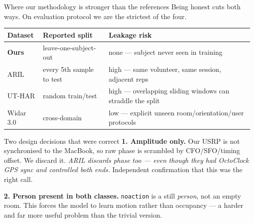 \documentclass[aspectratio=169,10pt]{beamer}
\newcommand{\gd}[1]{\textcolor{good}{#1}}
\newcommand{\bd}[1]{\textcolor{bad}{#1}}
\begin{document}
\begin{frame}{Where our methodology is stronger than the references}
\footnotesize
Being honest cuts both ways. On evaluation protocol we are the strictest of the four.

\vspace{0.3em}
\begin{table}\scriptsize
\begin{tabular}{@{}lll@{}}
\toprule
\textbf{Dataset} & \textbf{Reported split} & \textbf{Leakage risk}\\
\midrule
\rowcolor{green!8}\textbf{Ours} & leave-one-subject-out & \gd{none --- subject never seen in training}\\
ARIL & every 5th sample to test & \bd{high} --- same volunteer, same session, adjacent reps\\
UT-HAR & random train/test & \bd{high} --- overlapping sliding windows can straddle the split\\
Widar 3.0 & cross-domain & \gd{low} --- explicit unseen room/orientation/user protocols\\
\bottomrule
\end{tabular}
\end{table}

\vspace{0.3em}
\begin{block}{\small Two design decisions that were correct}
\scriptsize
\textbf{1. Amplitude only.} Our USRP is not synchronised to the MacBook, so raw phase is
scrambled by CFO/SFO/timing offset. We discard it. \emph{ARIL discards phase too --- even
though they had OctoClock GPS sync and controlled both ends.} Independent confirmation
that this was the right call.

\vspace{0.2em}
\textbf{2. Person present in both classes.} \texttt{noaction} is a still \emph{person},
not an empty room. This forces the model to learn motion rather than occupancy --- a
harder and far more useful problem than the trivial version.
\end{block}
\end{frame}
\end{document}
